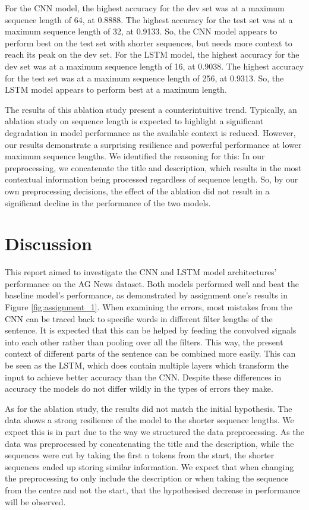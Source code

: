 \documentclass[12pt,a4paper,english]{article}
\begin{document}
For the CNN model, the highest accuracy for the dev set was at a maximum sequence length of 64, at 0.8888. The highest accuracy for the test set was at a maximum sequence length of 32, at 0.9133. So, the CNN model appears to perform best on the test set with shorter sequences, but needs more context to reach its peak on the dev set. For the LSTM model, the highest accuracy for the dev set was at a maximum sequence length of 16, at 0.9038. The highest accuracy for the test set was at a maximum sequence length of 256, at 0.9313. So, the LSTM model appears to perform best at a maximum length.

The results of this ablation study present a counterintuitive trend. Typically, an ablation study on sequence length is expected to highlight a significant degradation in model performance as the available context is reduced. However, our results demonstrate a surprising resilience and powerful performance at lower maximum sequence lengths. We identified the reasoning for this: In our preprocessing, we concatenate the title and description, which results in the most contextual information being processed regardless of sequence length. So, by our own preprocessing decisions, the effect of the ablation did not result in a significant decline in the performance of the two models. 

\section{Discussion}
This report aimed to investigate the CNN and LSTM model architectures' performance on the AG News dataset. Both models performed well and beat the baseline model's performance, as demonstrated by assignment one's results in Figure \ref{fig:assignment_1}. When examining the errors, most mistakes from the CNN can be traced back to specific words in different filter lengths of the sentence. It is expected that this can be helped by feeding the convolved signals into each other rather than pooling over all the filters. This way, the present context of different parts of the sentence can be combined more easily. This can be seen as the LSTM, which does contain multiple layers which transform the input to achieve better accuracy than the CNN. Despite these differences in accuracy the models do not differ wildly in the types of errors they make.

As for the ablation study, the results did not match the initial hypothesis. The data shows a strong resilience of the model to the shorter sequence lengths. We expect this is in part due to the way we structured the data preprocessing. As the data was preprocessed by concatenating the title and the description, while the sequences were cut by taking the first n tokens from the start, the shorter sequences ended up storing similar information. We expect that when changing the preprocessing to only include the description or when taking the sequence from the centre and not the start, that the hypothesised decrease in performance will be observed. 
\end{document}
